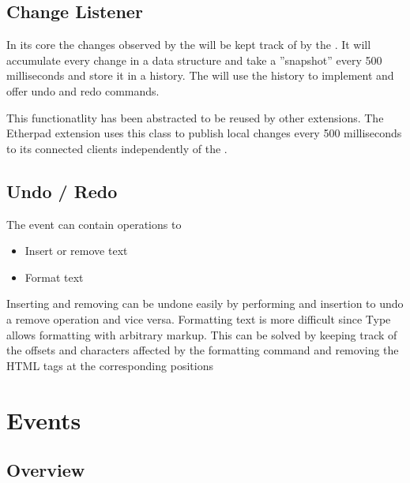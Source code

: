\subsection{Change Listener}

In its core the changes observed by the  will be kept track of by the . It will accumulate every change in a data structure and take a ''snapshot'' every 500 milliseconds and store it in a history. The  will use the history to implement and offer undo and redo commands.

This functionatlity has been abstracted to be reused by other extensions. The Etherpad extension uses this class to publish local changes every 500 milliseconds to its connected clients independently of the .

\subsection{Undo / Redo}

The  event can contain operations to

\begin{itemize}
\item Insert or remove text
\item Format text
\end{itemize}

Inserting and removing can be undone easily by performing and insertion to undo a remove operation and vice versa. Formatting text is more difficult since Type allows formatting with arbitrary markup. This can be solved by keeping track of the offsets and characters affected by the formatting command and removing the HTML tags at the corresponding positions






\section{Events}
\label{sec:events}
\subsection{Overview}

